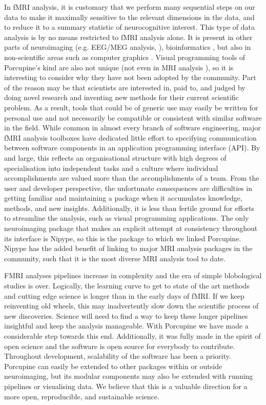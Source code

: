 In fMRI analysis, it is customary that we perform many sequential steps on our data to make it maximally sensitive to the relevant dimensions in the data, and to reduce it to a summary statistic of neurocognitive interest. This type of data analysis is by no means restricted to fMRI analysis alone. It is present in other parts of neuroimaging (e.g. EEG/MEG analysis, \cite{Oostenveld2011}), bioinformatics \cite{Wolstencroft2013}, but also in non-scientific areas such as computer graphics \cite{Blender}. Visual programming tools of Porcupine's kind are also not unique (not even in MRI analysis \cite{Lucas2010}), so it is interesting to consider why they have not been adopted by the community. Part of the reason may be that scientists are interested in, paid to, and judged by doing novel research and inventing new methods for their current scientific problem. As a result, tools that could be of generic use may easily be written for personal use and not necessarily be compatible or consistent with similar software in the field. While common in almost every branch of software engineering, major fMRI analysis toolboxes have dedicated little effort to specifying communication between software components in an application programming interface (API). By and large, this reflects an organisational structure with high degrees of specialisation into independent tasks and a culture where individual accomplishments are valued more than the accomplishments of a team. From the user and developer perspective, the unfortunate consequences are difficulties in getting familiar and maintaining a package when it accumulates knowledge, methods, and new insights. Additionally, it is less than fertile ground for efforts to streamline the analysis, such as visual programming applications. The only neuroimaging package that makes an explicit attempt at consistency throughout its interface is Nipype, so this is the package to which we linked Porcupine. Nipype has the added benefit of linking to major MRI analysis packages in the community, such that it is the most diverse MRI analysis tool to date.

FMRI analyses pipelines increase in complexity and the era of simple blobological studies is over. Logically, the learning curve to get to state of the art methods and cutting edge science is longer than in the early days of fMRI. If we keep reinventing old wheels, this may inadvertently slow down the scientific process of new discoveries. Science will need to find a way to keep these longer pipelines insightful and keep the analysis manageable. With Porcupine we have made a considerable step towards this end. Additionally, it was fully made in the spirit of open science and the software is open source for everybody to contribute. Throughout development, scalability of the software has been a priority. Porcupine can easily be extended to other packages within or outside neuroimaging, but its modular components may also be extended with running pipelines or visualising data. We believe that this is a valuable direction for a more open, reproducible, and sustainable science.

